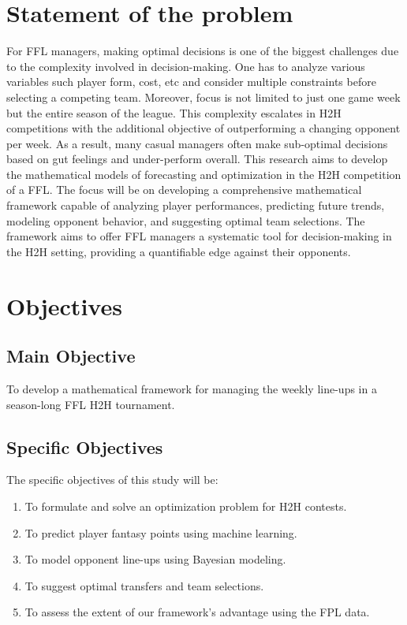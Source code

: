 		\section{Statement of the problem}
			For FFL managers, making optimal decisions is one of the biggest challenges due to the complexity involved in decision-making. One has to analyze various variables such player form, cost, etc and consider multiple constraints before selecting a competing team. Moreover, focus is not limited to just one game week but the entire season of the league. This complexity escalates in H2H competitions with the additional objective of outperforming a changing opponent per week. As a result, many casual managers often make sub-optimal decisions based on gut feelings and under-perform overall. This research aims to develop the mathematical models of forecasting and optimization in the H2H competition of a FFL. The focus will be on developing a comprehensive mathematical framework capable of analyzing player performances, predicting future trends, modeling opponent behavior, and suggesting optimal team selections. The framework aims to offer FFL managers a systematic tool for decision-making in the H2H setting, providing a quantifiable edge against their opponents.


		\section{Objectives}
			\subsection{Main Objective}
				To develop a mathematical framework for managing the weekly line-ups in a season-long FFL H2H tournament.

			\subsection{Specific Objectives}
				The specific objectives of this study will be:
				\begin{enumerate}
					\item[(i)] To formulate and solve an optimization problem for H2H contests.
					\item[(ii)] To predict player fantasy points using machine learning.
					\item[(iii)] To model opponent line-ups using Bayesian modeling.
					\item[(iv)] To suggest optimal transfers and team selections.
					\item[(v)] To assess the extent of our framework's advantage using the FPL data.
				\end{enumerate}

